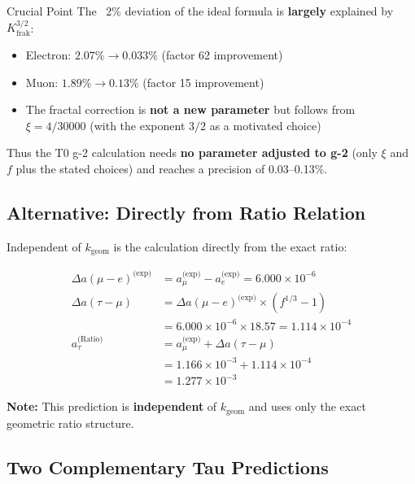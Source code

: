 	\begin{important}{Crucial Point}
		The ~2\% deviation of the ideal formula is \textbf{largely} explained by $K_\text{frak}^{3/2}$:
		\begin{itemize}
			\item Electron: $2.07\% \to 0.033\%$ (factor 62 improvement)
			\item Muon: $1.89\% \to 0.13\%$ (factor 15 improvement)
			\item The fractal correction is \textbf{not a new parameter} but follows from $\xi = 4/30000$ (with the exponent $3/2$ as a motivated choice)
		\end{itemize}
		
		Thus the T0 g-2 calculation needs \textbf{no parameter adjusted to g-2} (only $\xi$ and $f$ plus the stated choices) and reaches a precision of 0.03--0.13\%.
	\end{important}
	
	\subsection{Alternative: Directly from Ratio Relation}
	
	Independent of $k_{\text{geom}}$ is the calculation directly from the exact ratio:
	
	\begin{align}
		\Delta a(\mu-e)^{\text{(exp)}} &= a_\mu^{\text{(exp)}} - a_e^{\text{(exp)}} = 6.000 \times 10^{-6} \\
		\Delta a(\tau-\mu) &= \Delta a(\mu-e)^{\text{(exp)}} \times (f^{1/3} - 1) \\
		&= 6.000 \times 10^{-6} \times 18.57 = 1.114 \times 10^{-4} \\
		a_\tau^{\text{(Ratio)}} &= a_\mu^{\text{(exp)}} + \Delta a(\tau-\mu) \\
		&= 1.166 \times 10^{-3} + 1.114 \times 10^{-4} \\
		&= \boxed{1.277 \times 10^{-3}}
	\end{align}
	
	\textbf{Note:} This prediction is \textbf{independent} of $k_{\text{geom}}$ and uses only the exact geometric ratio structure.
	
	\subsection{Two Complementary Tau Predictions}
	
